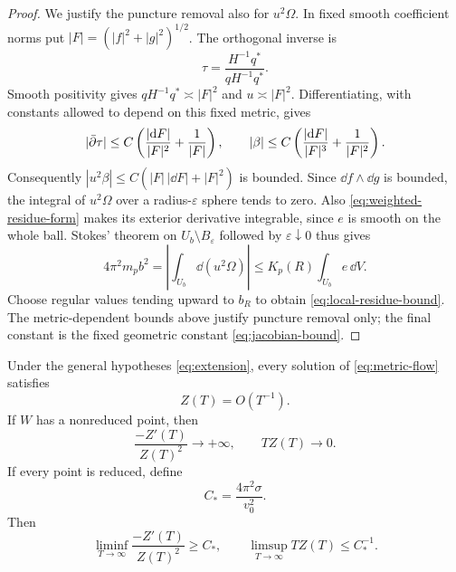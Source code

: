 \begin{proof}
We justify the puncture removal also for $u^2\Omega$.
In fixed smooth coefficient norms put
$|F|=(|f|^2+|g|^2)^{1/2}$. The orthogonal inverse is
\[
                  \tau=\frac{H^{-1}q^*}{qH^{-1}q^*}.
\]
Smooth positivity gives $qH^{-1}q^*\asymp|F|^2$ and
$u\asymp|F|^2$. Differentiating, with constants allowed
to depend on this fixed metric, gives
\[
 |\bar\partial\tau|\le C\left(\frac{|\mathrm d F|}{|F|^2}
                                  +\frac1{|F|}\right),
 \qquad
 |\beta|\le C\left(\frac{|\mathrm d F|}{|F|^3}
                                  +\frac1{|F|^2}\right).
\]
Consequently $|u^2\beta|\le C(|F|\,|\dd F|+|F|^2)$
is bounded. Since $\dd f\wedge\dd g$ is bounded, the
integral of $u^2\Omega$ over a radius-$\varepsilon$ sphere
tends to zero. Also \eqref{eq:weighted-residue-form}
makes its exterior derivative integrable, since $e$ is
smooth on the whole ball. Stokes' theorem on
$U_b\setminus B_\varepsilon$ followed by
$\varepsilon\downarrow0$ thus gives
\[
 4\pi^2m_pb^2
      =\left|\int_{U_b}\dd(u^2\Omega)\right|
      \le K_p(R)\int_{U_b}e\,\dd V.
\]
Choose regular values tending upward to $b_R$ to obtain
\eqref{eq:local-residue-bound}. The metric-dependent bounds
above justify puncture removal only; the final constant is
the fixed geometric constant \eqref{eq:jacobian-bound}.
\end{proof}

\begin{theorem}\label{thm:general-upper-rate}
Under the general hypotheses \eqref{eq:extension}, every
solution of \eqref{eq:metric-flow} satisfies
\begin{equation}\label{eq:general-upper-rate}
                           Z(T)=O(T^{-1}).
\end{equation}
If $W$ has a nonreduced point, then
\begin{equation}\label{eq:nonreduced-rate}
       \frac{-Z'(T)}{Z(T)^2}\longrightarrow+\infty,
                          \qquad TZ(T)\longrightarrow0 .
\end{equation}
If every point is reduced, define
\begin{equation}\label{eq:mass-coefficient}
                  C_*=\frac{4\pi^2\sigma}{v_0^2}.
\end{equation}
Then
\begin{equation}\label{eq:reduced-liminf}
 \liminf_{T\to\infty}\frac{-Z'(T)}{Z(T)^2}\ge C_*,
             \qquad \limsup_{T\to\infty}TZ(T)\le C_*^{-1}.
\end{equation}
\end{theorem}

